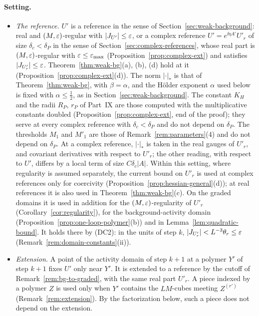 \paragraph{Setting.}
\begin{itemize}
\item \emph{The reference.} $U'$ is a reference in the sense of Section~\ref{sec:weak-background}: real and $(M,\varepsilon)$-regular with $|J_{U'}|\le\varepsilon$, or a complex reference $U'=e^{\ii\eta A'}U'_r$ of size $\delta_c<\delta_P$ in the sense of Section~\ref{sec:complex-references}, whose real part is $(M,\varepsilon)$-regular with $\varepsilon\le\varepsilon_{\max}$ (Proposition~\ref{prop:complex-ext}) and satisfies $|J_{U'_r}|\le\varepsilon$. Theorem~\ref{thm:weak-bg}(a), (b), (d) hold at it (Proposition~\ref{prop:complex-ext}(d)). The norm $|\cdot|_*$ is that of Theorem~\ref{thm:weak-bg}, with $\beta=\alpha$, and the H\"older exponent $\alpha$ used below is fixed with $\alpha\le\frac12$, as in Section~\ref{sec:weak-background}. The constant $K_H$ and the radii $R_P$, $r_P$ of Part~IX are those computed with the multiplicative constants doubled (Proposition~\ref{prop:complex-ext}, end of the proof); they serve at every complex reference with $\delta_c<\delta_P$ and do not depend on $\delta_P$. The thresholds $M_1$ and $M'_1$ are those of Remark~\ref{rem:parameters}(4) and do not depend on $\delta_P$. At a complex reference, $|\cdot|_*$ is taken in the real gauges of $U'_r$, and covariant derivatives with respect to $U'_r$; the other reading, with respect to $U'$, differs by a local term of size $C\delta_c|A|$. Within this setting, where regularity is assumed separately, the current bound on $U'_r$ is used at complex references only for coercivity (Proposition~\ref{prop:hessian-general}(d)); at real references it is also used in Theorem~\ref{thm:weak-bg}(c). On the graded domains it is used in addition for the $(M,\varepsilon)$-regularity of $U'_r$ (Corollary~\ref{cor:regularity}), for the background-activity domain (Proposition~\ref{prop:one-loop-polymer}(b)) and in Lemma~\ref{lem:quadratic-bound}. It holds there by (DC2): in the units of step $k$, $|J_{U'_r}|<L^{-3}\theta_r\le\varepsilon$ (Remark~\ref{rem:domain-constants}(ii)).
\item \emph{Extension.} A point of the activity domain of step $k+1$ at a polymer $Y'$ of step $k+1$ fixes $U'$ only near $Y'$. It is extended to a reference by the cutoff of Remark~\ref{rem:bg-to-graded}, with the same real part $U'_r$. A piece indexed by a polymer $Z$ is used only when $Y'$ contains the $LM$-cubes meeting $Z^{(r')}$ (Remark~\ref{rem:extension}). By the factorization below, such a piece does not depend on the extension.

\end{itemize}
